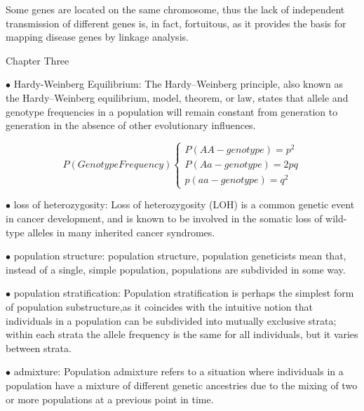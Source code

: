 \documentclass{article}
\begin{document}
Some genes are located on the same chromosome, thus the lack of independent transmission of different genes is, in fact, fortuitous, as it provides the basis for mapping disease genes by linkage analysis.




\newpage
\centerline{\sc Chapter Three}


\vspace{1pc}
$\bullet$ Hardy-Weinberg Equilibrium:
The Hardy–Weinberg principle, also known as the Hardy–Weinberg equilibrium, model, theorem, or law, states that allele and genotype frequencies in a population will remain constant from generation to generation in the absence of other evolutionary influences.



 \[
    P(Genotype Frequency)\left\{
                \begin{array}{ll}
                  P(AA - genotype) = p^{2}\\
                  P(Aa - genotype) = 2pq\\
                  p(aa - genotype) = q^{2}
                \end{array}
              \right.
  \]


\vspace{1pc}
$\bullet$ loss of heterozygosity:
Loss of heterozygosity (LOH) is a common genetic event in cancer development, and is known to be involved in the somatic loss of wild-type alleles in many inherited cancer syndromes.

\vspace{1pc}
$\bullet$ population structure:
population structure, population geneticists mean that, instead of a single, simple population, populations are subdivided in some way.

\vspace{1pc}
$\bullet$ population stratification:
Population stratification is perhaps the simplest form of population substructure,as it coincides with the intuitive notion that individuals in a population can be subdivided into mutually exclusive strata; within each strata the allele frequency is the same for all individuals, but it varies between strata.


\vspace{1pc}
$\bullet$ admixture:
Population admixture refers to a situation where individuals in a population have a mixture of different genetic ancestries due to the mixing of two or more populations at a previous point in time.
\end{document}
